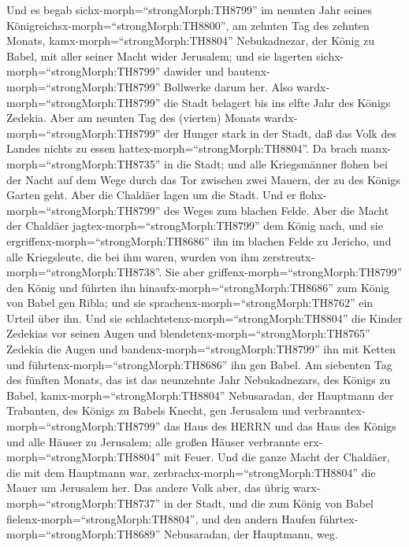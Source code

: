  Und es begab sichx-morph=``strongMorph:TH8799'' im neunten
Jahr seines Königreichsx-morph=``strongMorph:TH8800'', am zehnten Tag
des zehnten Monats, kamx-morph=``strongMorph:TH8804'' Nebukadnezar, der
König zu Babel, mit aller seiner Macht wider Jerusalem; und sie lagerten
sichx-morph=``strongMorph:TH8799'' dawider und
bautenx-morph=``strongMorph:TH8799'' Bollwerke darum her. 
Also wardx-morph=``strongMorph:TH8799'' die Stadt belagert bis ins elfte
Jahr des Königs Zedekia.  Aber am neunten Tag des (vierten)
Monats wardx-morph=``strongMorph:TH8799'' der Hunger stark in der Stadt,
daß das Volk des Landes nichts zu essen
hattex-morph=``strongMorph:TH8804''.  Da brach
manx-morph=``strongMorph:TH8735'' in die Stadt; und alle Kriegsmänner
flohen bei der Nacht auf dem Wege durch das Tor zwischen zwei Mauern,
der zu des Königs Garten geht. Aber die Chaldäer lagen um die Stadt. Und
er flohx-morph=``strongMorph:TH8799'' des Weges zum blachen Felde.
 Aber die Macht der Chaldäer
jagtex-morph=``strongMorph:TH8799'' dem König nach, und sie
ergriffenx-morph=``strongMorph:TH8686'' ihn im blachen Felde zu Jericho,
und alle Kriegsleute, die bei ihm waren, wurden von ihm
zerstreutx-morph=``strongMorph:TH8738''.  Sie aber
griffenx-morph=``strongMorph:TH8799'' den König und führten ihn
hinaufx-morph=``strongMorph:TH8686'' zum König von Babel gen Ribla; und
sie sprachenx-morph=``strongMorph:TH8762'' ein Urteil über ihn.
 Und sie schlachtetenx-morph=``strongMorph:TH8804'' die
Kinder Zedekias vor seinen Augen und
blendetenx-morph=``strongMorph:TH8765'' Zedekia die Augen und
bandenx-morph=``strongMorph:TH8799'' ihn mit Ketten und
führtenx-morph=``strongMorph:TH8686'' ihn gen Babel.  Am
siebenten Tag des fünften Monats, das ist das neunzehnte Jahr
Nebukadnezars, des Königs zu Babel, kamx-morph=``strongMorph:TH8804''
Nebusaradan, der Hauptmann der Trabanten, des Königs zu Babels Knecht,
gen Jerusalem  und verbranntex-morph=``strongMorph:TH8799''
das Haus des HERRN und das Haus des Königs und alle Häuser zu Jerusalem;
alle großen Häuser verbrannte erx-morph=``strongMorph:TH8804'' mit
Feuer.  Und die ganze Macht der Chaldäer, die mit dem
Hauptmann war, zerbrachx-morph=``strongMorph:TH8804'' die Mauer um
Jerusalem her.  Das andere Volk aber, das übrig
warx-morph=``strongMorph:TH8737'' in der Stadt, und die zum König von
Babel fielenx-morph=``strongMorph:TH8804'', und den andern Haufen
führtex-morph=``strongMorph:TH8689'' Nebusaradan, der Hauptmann, weg.
